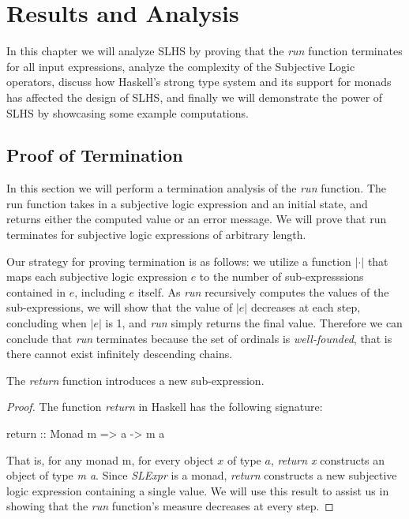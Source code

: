\documentclass[thesis.tex]{subfiles}
\begin{document}
\chapter{Results and Analysis}
\label{chap:results-and-analysis}

In this chapter we will analyze SLHS by proving that the \emph{run} function terminates for
all input expressions, analyze the complexity of the Subjective Logic operators,
discuss how Haskell's strong type system and its support for monads has affected the
design of SLHS, and finally we will demonstrate the power of SLHS by showcasing some
example computations.


\section{Proof of Termination}
\label{sec:termination}

In this section we will perform a termination analysis of the \emph{run} function. The
run function takes in a subjective logic expression and an initial state, and returns
either the computed value or an error message. We will prove that run terminates for
subjective logic expressions of arbitrary length.

Our strategy for proving termination is as follows: we utilize a function $|\cdot|$ that
maps each subjective logic expression $e$ to the number of sub-expresssions contained in
$e$, including $e$ itself. As \emph{run} recursively computes the values of the
sub-expressions, we will show that the value of $|e|$ decreases at each step, concluding
when $|e|$ is 1, and \emph{run} simply returns the final value. Therefore we can conclude
that \emph{run} terminates because the set of ordinals is \emph{well-founded}, that is there
cannot exist infinitely descending chains.

\begin{lemma}
  The \emph{return} function introduces a new sub-expression.
\end{lemma}

\begin{proof}
  The function \emph{return} in Haskell has the following signature:

  \begin{spec}
    return :: Monad m => a -> m a
  \end{spec}

  That is, for any monad m, for every object $x$ of type $a$, \emph{return x} constructs
  an object of type \emph{m a}. Since \emph{SLExpr} is a monad, \emph{return} constructs
  a new subjective logic expression containing a single value. We will use this result to
  assist us in showing that the \emph{run} function's measure decreases at every step.
\end{proof}
\end{document}

